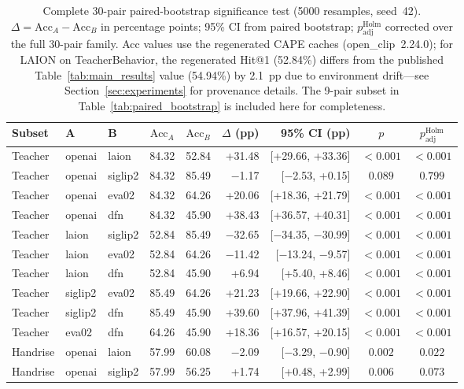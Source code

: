 \documentclass[symmetry,article,submit,pdftex,moreauthors]{Definitions/mdpi}
\begin{document}
\begin{table}[H]
\caption{Complete 30-pair paired-bootstrap significance test (5000 resamples, seed~42). $\Delta=\text{Acc}_A-\text{Acc}_B$ in percentage points; 95\% CI from paired bootstrap; $p_{\text{adj}}^{\text{Holm}}$ corrected over the full 30-pair family. Acc values use the regenerated CAPE caches (open\_clip~2.24.0); for LAION on TeacherBehavior, the regenerated Hit@1 (52.84\%) differs from the published Table~\ref{tab:main_results} value (54.94\%) by 2.1~pp due to environment drift---see Section~\ref{sec:experiments} for provenance details. The 9-pair subset in Table~\ref{tab:paired_bootstrap} is included here for completeness.}
\label{tab:paired_bootstrap_full}
\centering
\footnotesize
\setlength{\tabcolsep}{2.5pt}
\begin{tabular}{l l l c c r r c c}
\toprule
\textbf{Subset} & \textbf{A} & \textbf{B} & $\text{Acc}_A$ & $\text{Acc}_B$ & $\Delta$ (pp) & 95\% CI (pp) & $p$ & $p_{\text{adj}}^{\text{Holm}}$ \\
\midrule
Teacher & openai & laion & 84.32 & 52.84 & +31.48 & [+29.66, +33.36] & $<0.001$ & $<0.001$ \\
Teacher & openai & siglip2 & 84.32 & 85.49 & $-$1.17 & [$-$2.53, +0.15] & $0.089$ & $0.799$ \\
Teacher & openai & eva02 & 84.32 & 64.26 & +20.06 & [+18.36, +21.79] & $<0.001$ & $<0.001$ \\
Teacher & openai & dfn & 84.32 & 45.90 & +38.43 & [+36.57, +40.31] & $<0.001$ & $<0.001$ \\
Teacher & laion & siglip2 & 52.84 & 85.49 & $-$32.65 & [$-$34.35, $-$30.99] & $<0.001$ & $<0.001$ \\
Teacher & laion & eva02 & 52.84 & 64.26 & $-$11.42 & [$-$13.24, $-$9.57] & $<0.001$ & $<0.001$ \\
Teacher & laion & dfn & 52.84 & 45.90 & +6.94 & [+5.40, +8.46] & $<0.001$ & $<0.001$ \\
Teacher & siglip2 & eva02 & 85.49 & 64.26 & +21.23 & [+19.66, +22.90] & $<0.001$ & $<0.001$ \\
Teacher & siglip2 & dfn & 85.49 & 45.90 & +39.60 & [+37.96, +41.39] & $<0.001$ & $<0.001$ \\
Teacher & eva02 & dfn & 64.26 & 45.90 & +18.36 & [+16.57, +20.15] & $<0.001$ & $<0.001$ \\
\midrule
Handrise & openai & laion & 57.99 & 60.08 & $-$2.09 & [$-$3.29, $-$0.90] & $0.002$ & $0.022$ \\
Handrise & openai & siglip2 & 57.99 & 56.25 & +1.74 & [+0.48, +2.99] & $0.006$ & $0.073$ \\

\end{tabular}
\end{table}
\end{document}
